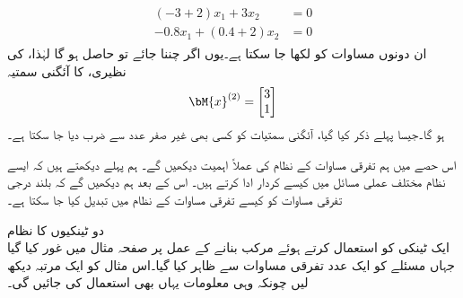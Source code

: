 \begin{gather*}
\begin{aligned}
(-3+2)x_1+3x_2&=0\\
-0.8x_1+(0.4+2)x_2&=0
\end{aligned}
\end{gather*}
ان دونوں مساوات کو  لکھا جا سکتا ہے۔یوں اگر  چننا جائے تو  حاصل ہو گا لہٰذا،  کی نظیری،  کا آئگنی سمتیہ 
\begin{align*}
\bM{x}^{(2)}=
\begin{bmatrix}
3\\
1
\end{bmatrix}
\end{align*}
ہو گا۔جیسا پہلے ذکر کیا گیا، آئگنی سمتیات کو کسی  بھی غیر صفر عدد سے ضرب دیا جا سکتا ہے۔

اس حصے میں ہم  تفرقی مساوات کے نظام کی عملاً اہمیت دیکھیں گے۔ ہم پہلے دیکھتے ہیں کہ ایسے نظام مختلف عملی مسائل میں کیسے کردار ادا کرتے ہیں۔ اس کے بعد ہم دیکھیں گے کہ بلند درجی تفرقی مساوات کو کیسے تفرقی مساوات کے نظام میں تبدیل کیا جا سکتا ہے۔

\quad دو ٹینکیوں کا نظام\\
ایک ٹینکی کو استعمال کرتے ہوئے مرکب بنانے کے عمل پر صفحہ  مثال  میں غور کیا گیا جہاں مسئلے کو ایک عدد تفرقی مساوات سے ظاہر کیا گیا۔اس مثال کو ایک مرتبہ دیکھ لیں چونکہ وہی معلومات یہاں بھی استعمال کی جائیں گی۔
 

